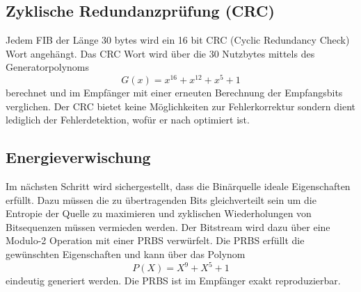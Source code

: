 \subsection{Zyklische Redundanzprüfung (CRC)}
\label{sec:crc}
Jedem \ac{FIB} der Länge 30 bytes wird ein 16 bit CRC (Cyclic Redundancy Check) Wort angehängt. Das CRC Wort wird über die 30 Nutzbytes mittels des Generatorpolynoms
\begin{equation}
G(x) = x^{16} + x^{12} + x^5 + 1
\end{equation}
berechnet und im Empfänger mit einer erneuten Berechnung der Empfangsbits verglichen. Der CRC bietet keine Möglichkeiten zur Fehlerkorrektur sondern dient lediglich der Fehlerdetektion, wofür er nach \cite{crc:recommendation} optimiert ist.

\subsection{Energieverwischung}
\label{sec:energieverwischung}
Im nächsten Schritt wird sichergestellt, dass die Binärquelle ideale Eigenschaften erfüllt. Dazu müssen die zu übertragenden Bits gleichverteilt sein um die Entropie der Quelle zu maximieren und zyklischen Wiederholungen von Bitsequenzen müssen vermieden werden. Der Bitstream wird dazu über eine Modulo-2 Operation mit einer \ac{PRBS} verwürfelt. Die \ac{PRBS} erfüllt die gewünschten Eigenschaften und kann über das Polynom
\begin{equation}
\label{eq:energy_dispersal}
P(X) = X^9 + X^5 + 1
\end{equation}
eindeutig generiert werden. Die PRBS ist im Empfänger exakt reproduzierbar.

